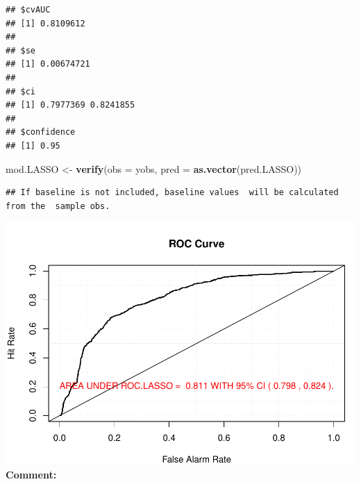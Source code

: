 \documentclass[
  11pt,
]{article}
\newenvironment{Shaded}{\begin{snugshade}}{\end{snugshade}}
\newcommand{\AttributeTok}[1]{\textcolor[rgb]{0.13,0.29,0.53}{#1}}
\newcommand{\ConstantTok}[1]{\textcolor[rgb]{0.56,0.35,0.01}{#1}}
\newcommand{\DecValTok}[1]{\textcolor[rgb]{0.00,0.00,0.81}{#1}}
\newcommand{\DocumentationTok}[1]{\textcolor[rgb]{0.56,0.35,0.01}{\textbf{\textit{#1}}}}
\newcommand{\FloatTok}[1]{\textcolor[rgb]{0.00,0.00,0.81}{#1}}
\newcommand{\FunctionTok}[1]{\textcolor[rgb]{0.13,0.29,0.53}{\textbf{#1}}}
\newcommand{\NormalTok}[1]{#1}
\newcommand{\OtherTok}[1]{\textcolor[rgb]{0.56,0.35,0.01}{#1}}
\newcommand{\SpecialCharTok}[1]{\textcolor[rgb]{0.81,0.36,0.00}{\textbf{#1}}}
\newcommand{\StringTok}[1]{\textcolor[rgb]{0.31,0.60,0.02}{#1}}
\begin{document}
\begin{verbatim}
## $cvAUC
## [1] 0.8109612
## 
## $se
## [1] 0.00674721
## 
## $ci
## [1] 0.7977369 0.8241855
## 
## $confidence
## [1] 0.95
\end{verbatim}

\begin{Shaded}
\begin{Highlighting}[]
\NormalTok{mod.LASSO }\OtherTok{\textless{}{-}} \FunctionTok{verify}\NormalTok{(}\AttributeTok{obs =}\NormalTok{ yobs, }\AttributeTok{pred =} \FunctionTok{as.vector}\NormalTok{(pred.LASSO))}
\end{Highlighting}
\end{Shaded}

\begin{verbatim}
## If baseline is not included, baseline values  will be calculated from the  sample obs.
\end{verbatim}

\begin{Shaded}
\end{Shaded}

\includegraphics[width=0.9\linewidth]{OWUSU_project_files/figure-latex/unnamed-chunk-25-1}\\
\textbf{Comment:}
\end{document}
